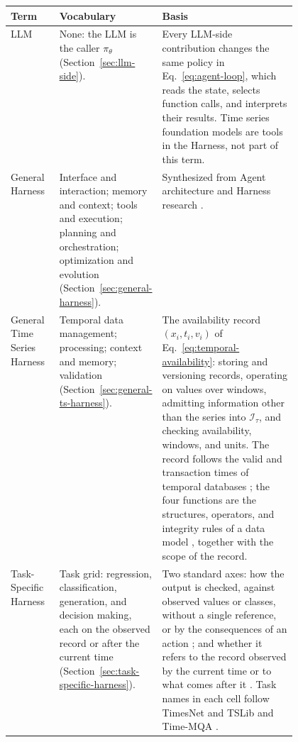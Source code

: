 \documentclass[preprints,article,submit,moreauthors]{Definitions/mdpi}
\begin{document}
\begin{table}[t]
\centering\small
\setlength{\tabcolsep}{4pt}
\renewcommand{\arraystretch}{1.12}
\renewcommand{\tabularxcolumn}[1]{p{#1}}
\begin{tabularx}{\linewidth}{@{}>{\raggedright\arraybackslash}p{0.17\linewidth}>{\raggedright\arraybackslash}p{0.30\linewidth}>{\raggedright\arraybackslash}X@{}}
\toprule
\textbf{Term} & \textbf{Vocabulary} & \textbf{Basis}\\
\midrule
LLM & None: the LLM is the caller $\pi_\theta$ (Section~\ref{sec:llm-side}). & Every LLM-side contribution changes the same policy in Eq.~\eqref{eq:agent-loop}, which reads the state, selects function calls, and interprets their results. Time series foundation models are tools in the Harness, not part of this term.\\
General Harness & Interface and interaction; memory and context; tools and execution; planning and orchestration; optimization and evolution (Section~\ref{sec:general-harness}). & Synthesized from Agent architecture and Harness research \citep{sumers2024coala,wang2024agentsurvey,ning2026codeharness,lin2026agenticharness}.\\
General Time Series Harness & Temporal data management; processing; context and memory; validation (Section~\ref{sec:general-ts-harness}). & The availability record $(x_i,t_i,v_i)$ of Eq.~\eqref{eq:temporal-availability}: storing and versioning records, operating on values over windows, admitting information other than the series into $\mathcal{I}_\tau$, and checking availability, windows, and units. The record follows the valid and transaction times of temporal databases \citep{snodgrass1985taxonomy,jensen1999temporal}; the four functions are the structures, operators, and integrity rules of a data model \citep{codd1980datamodels}, together with the scope of the record.\\
Task-Specific Harness & Task grid: regression, classification, generation, and decision making, each on the observed record or after the current time (Section~\ref{sec:task-specific-harness}). & Two standard axes: how the output is checked, against observed values or classes, without a single reference, or by the consequences of an action \citep{hastie2009esl,gneiting2007scoring}; and whether it refers to the record observed by the current time or to what comes after it \citep{wiener1949extrapolation}. Task names in each cell follow TimesNet and TSLib \citep{wu2023timesnet,wang2024tslib} and Time-MQA \citep{kong2025timemqa}.\\

\end{tabularx}
\end{table}
\end{document}

